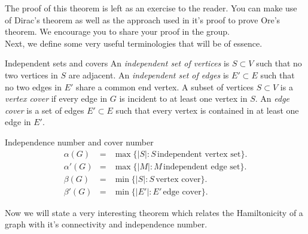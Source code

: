 \documentclass[../basic_graph_theory.tex]{subfiles}
\begin{document}
\begin{Thm}{}{}
The proof of this theorem is left as an exercise to the reader. You can make use of Dirac's theorem as well as the approach used in it's proof to prove Ore's theorem. We encourage you to share your proof in the group.\\
Next, we define some very useful terminologies that will be of essence.\\

\begin{Def}{Independent sets and covers}{}  
    An {\em independent set of vertices} is $S \subset V$ such that no two vertices in $S$ are adjacent. An {\em independent set of edges} is $E' \subset E$ such that no two edges in $E'$ share a common end vertex. A subset of vertices $S \subset V$ is a {\em vertex cover} if every edge in $G$ is incident to at least one vertex in $S$. An {\em edge cover} is a set of edges $E' \subset E$ such that every vertex is contained in at least one edge in $E'$.
\end{Def}
\begin{Def}{Independence number and cover number}{}
    \begin{eqnarray*}
        \alpha(G) & = & \max \{|S| : S \, \mbox{independent vertex set} \}. \\
        \alpha'(G) & = & \max \{|M| : M \, \mbox{independent edge set} \}. \\
        \beta(G) & = & \min \{|S| : S \, \mbox{vertex cover} \}.  \\
        \beta'(G) & = & \min \{|E'| : E' \, \mbox{edge cover} \}.
    \end{eqnarray*}
\end{Def}

Now we will state a very interesting theorem which relates the Hamiltonicity of a graph with it's connectivity and independence number.


\end{Thm}
\end{document}
